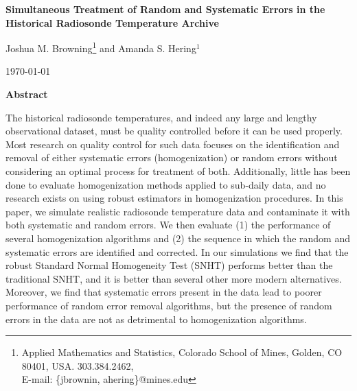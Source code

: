 \documentclass[12pt]{article}
\def\ni{\noindent}
\begin{document}
\thispagestyle{empty}
\baselineskip=28pt
\vskip 5mm
\begin{center} {\Large{\bf   Simultaneous Treatment of Random and Systematic Errors in the Historical Radiosonde Temperature Archive}}
\end{center}



\baselineskip=12pt
\vskip 5mm

\begin{center}\large
Joshua M. Browning\footnote{ \baselineskip=10pt
Applied Mathematics and Statistics, Colorado School of Mines, Golden, CO 80401,
USA. 303.384.2462, \\E-mail: \{jbrownin, ahering\}@mines.edu} and Amanda S. Hering$^1$




\end{center}

\baselineskip=17pt
\vskip 5mm
\centerline{\today}
\vskip 5mm

\begin{center}
{\large{\bf Abstract}}
\end{center}

\baselineskip=14pt

\ni  The historical radiosonde temperatures, and indeed any large and lengthy observational dataset, must be quality controlled before it can be  used properly.   Most research on quality control for such data focuses on the identification and removal of either systematic errors (homogenization) or   random errors without considering an optimal process for treatment of both.  Additionally, little has been done to evaluate  homogenization methods applied to sub-daily data, and no research exists on using robust estimators in homogenization procedures.  In this paper, we simulate realistic radiosonde temperature data and contaminate it with both systematic and random errors.  We then evaluate (1) the performance of several homogenization algorithms and (2) the sequence in which the random and systematic errors are identified and corrected.  In our simulations we find that the robust Standard Normal Homogeneity Test (SNHT) performs better than the traditional SNHT, and it is better than several other more modern alternatives.  Moreover, we find that systematic errors present in the data lead to poorer performance of random error removal algorithms, but the presence of random errors in the data are not as detrimental to homogenization algorithms.
\end{document}
